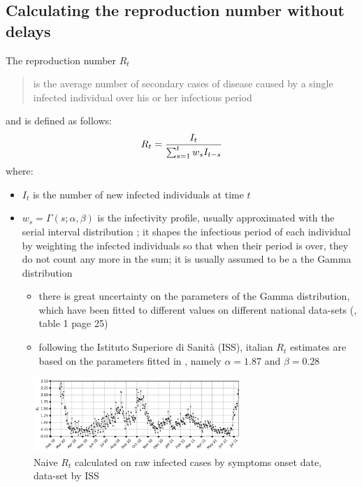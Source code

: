 \documentclass[graybox]{svmult}
\begin{document}
\subsection{Calculating the reproduction number without delays}
\label{indicator}
The reproduction number $R_t$ \cite{BettencourtRibeiro2008, CorietAl2013} \begin{quote}is the average number of secondary cases of disease caused by a single infected individual over his or her infectious period\end{quote}
and is defined as follows:
\begin{equation}
\large{R_t = \frac{I_t}{\sum_{s=1}^t w_s I_{t-s}}}
\label{RtDef}
\end{equation}
where:
\begin{itemize}
\item
$I_t$ is the number of new infected individuals at time $t$
\item 
$w_s=\Gamma(s; \alpha,\beta)$ is the infectivity profile, usually approximated with the serial interval distribution \cite{CorietAl2013}; it shapes the infectious period of each individual by weighting the infected individuals so that when their period is over, they do not count any more in the sum; it is usually assumed to be a the Gamma distribution \cite{CorietAl2013}
\begin{itemize}
\item 
there is great uncertainty on the parameters of the Gamma distribution, which have been fitted to different values on different national data-sets (\cite{RoyalSocSAGESPI-M}, table 1 page 25)
\item following the Istituto Superiore di Sanit\`{a} (ISS), italian $R_t$ estimates are based on the parameters fitted in \cite{CeredaetAl2020}, namely $\alpha = 1.87$ and $\beta = 0.28$
\end{itemize}
\end{itemize}

\begin{figure}[t]
\center
\includegraphics[width=0.7\textwidth]{Rt_images/naive_Rt_symptoms_onset.jpg}
\caption{Naive $R_t$ calculated on raw infected cases by symptoms onset date, data-set by ISS}
\label{naive_Rt_symptoms_onset}
\end{figure}
\end{document}
